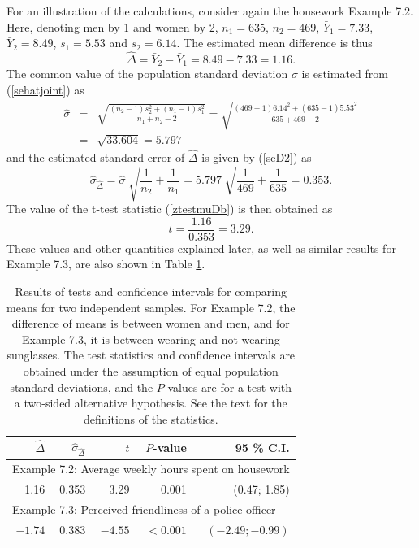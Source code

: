 For an
illustration of the calculations, consider again the housework Example
7.2. Here, denoting
men by 1 and women by 2, $n_{1}=635$, $n_{2}=469$, $\bar{Y}_{1}=7.33$,
$\bar{Y}_{2}=8.49$, $s_{1}=5.53$ and $s_{2}=6.14$. The estimated mean
difference is thus
\[
\hat{\Delta}=\bar{Y}_{2}-\bar{Y}_{1}=8.49-7.33=1.16.
\]
The common value of the population standard deviation $\sigma$ is
estimated from (\ref{sehatjoint}) as
\begin{eqnarray*}
\hat{\sigma}&=&
\sqrt{\frac{(n_{2}-1)s^{2}_{2}+(n_{1}-1)s^{2}_{1}}{n_{1}+n_{2}-2}}
=
\sqrt{\frac{(469-1) 6.14^{2}+(635-1) 5.53^{2}}{635+469-2}}\\
&=& \sqrt{33.604}=5.797
\end{eqnarray*}
and the estimated standard error of $\hat{\Delta}$ is given by
(\ref{seD2}) as
\[
\hat{\sigma}_{\hat{\Delta}} =
\hat{\sigma} \; \sqrt{\frac{1}{n_{2}}+\frac{1}{n_{1}}}
=5.797 \; \sqrt{\frac{1}{469}+\frac{1}{635}}=0.353.
\]
The value of the t-test statistic (\ref{ztestmuDb}) is then obtained as
\[
t=\frac{1.16}{0.353}=3.29.
\]
These values and other quantities explained later, as well as similar
results for Example 7.3, are also shown in Table \ref{t_2testsY1}.

\begin{table}
\caption{Results of tests and confidence intervals for comparing
means for two independent samples. For Example 7.2, the difference of
means is between women and men, and for Example 7.3, it is between
wearing and not wearing sunglasses.
The test statistics and confidence intervals are obtained under the
assumption of equal population standard deviations, and
the $P$-values are for a test with a
two-sided alternative hypothesis. See the text for the
definitions of the statistics.}
\label{t_2testsY1}
\begin{center}
\begin{tabular}{|rrrrr|}\hline

$\hat{\Delta}$ &
$\hat{\sigma}_{\hat{\Delta}}$ & $t$ & $P$-value & 95 \% C.I. \\ \hline
\multicolumn{5}{|l|}{Example 7.2: Average weekly hours spent on
housework} \\[.7ex]
1.16 & 0.353 & 3.29 & 0.001 & (0.47; 1.85) \\[1ex]  \hline
\multicolumn{5}{|l|}{Example 7.3: Perceived friendliness of a police
officer} \\[.7ex]
$-1.74$ & 0.383 & $-4.55$ & $<0.001$ & $(-2.49; -0.99)$
\\
\hline
\end{tabular}
\end{center}
\end{table}

